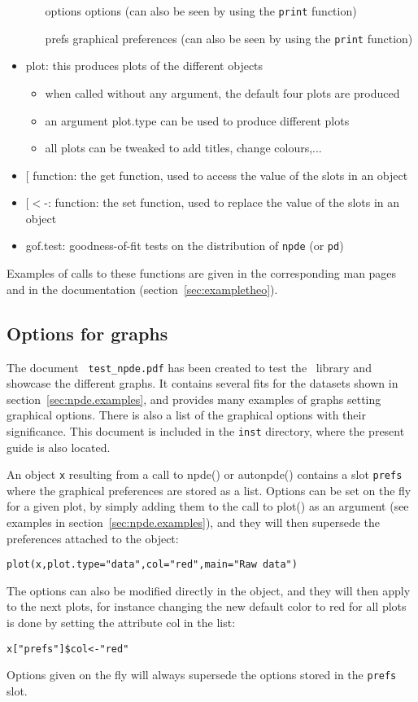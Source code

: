 \begin{itemize}
\begin{itemize}
   \item[options] options (can also be seen by using the \texttt{print} function)
   \item[prefs] graphical preferences (can also be seen by using the \texttt{print} function)
   \end{itemize}
\item plot: this produces plots of the different objects
   \begin{itemize}
   \item when called without any argument, the default four plots are produced
   \item an argument plot.type can be used to produce different plots
   \item all plots can be tweaked to add titles, change colours,...
   \end{itemize}
\item $[$ function: the get function, used to access the value of the slots in an object
\item $[<$-: function: the set function, used to replace the value of the slots in an object
\item gof.test: goodness-of-fit tests on the distribution of \texttt{npde} (or \texttt{pd})
\end{itemize}
Examples of calls to these functions are given in the corresponding man pages and in the documentation (section~\ref{sec:exampletheo}).

\subsection{Options for graphs}

\hskip 18pt The document \verb+ test_npde.pdf+ has been created to test the \npde~library and showcase the different graphs. It contains several fits for the datasets shown in section~\ref{sec:npde.examples}, and provides many examples of graphs setting graphical options. There is also a list of the graphical options with their significance. This document is included in the \verb+inst+ directory, where the present guide is also located.

\bigskip
An object \texttt{x} resulting from a call to {\sf npde()} or {\sf autonpde()} contains a slot \texttt{prefs} where the graphical preferences are stored as a list. Options can be set on the fly for a given plot, by simply adding them to the call to {\sf plot()} as an argument (see examples in section~\ref{sec:npde.examples}), and they will then supersede the preferences attached to the object:
\begin{verbatim}
plot(x,plot.type="data",col="red",main="Raw data")
\end{verbatim}
The options can also be modified directly in the object, and they will then apply to the next plots, for instance changing the new default color to red for all plots is done by setting the attribute {\sf col} in the list:
\begin{verbatim}
x["prefs"]$col<-"red"
\end{verbatim}
Options given on the fly will always supersede the options stored in the \texttt{prefs} slot.

